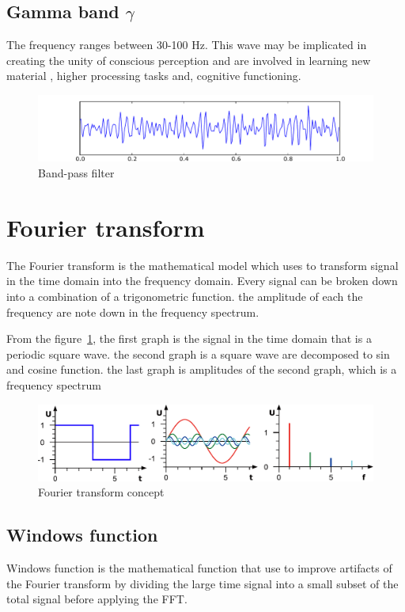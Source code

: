 \subsection{Gamma band $\gamma$} 
\hspace{1.5cm} The frequency ranges between 30-100 Hz. This wave may be implicated in creating the unity of conscious perception and are involved in learning new material , higher processing tasks and, cognitive functioning. 
\begin{figure}[ht]
	\centering
	\includegraphics[scale = 0.5]{chapter3/Eeg_gamma.pdf}
	\caption{Band-pass filter}
\end{figure}

\section{Fourier transform}
\hspace{1.5cm} The Fourier transform is the mathematical model which uses to transform signal in the time domain into the frequency domain. Every signal can be broken down into a combination of a trigonometric function.  the amplitude of each the frequency are note down in the frequency spectrum.\par
From the figure~\ref{fig:fourier}, the first graph is the signal in the time domain that is a periodic square wave. the second graph is a square wave are decomposed to sin and cosine function. the last graph is amplitudes of the second graph, which is a frequency spectrum \\
\begin{figure}[ht]
	\centering
	\includegraphics[scale = 0.75]{chapter3/ft.pdf}
	\caption{Fourier transform concept\cite{ft}}
    \label{fig:fourier}
\end{figure}

\subsection{Windows function}
\hspace{1.5cm} Windows function is the mathematical function that use to improve artifacts of the Fourier transform by dividing the large time signal into a small subset of the total signal before applying the FFT.\\

